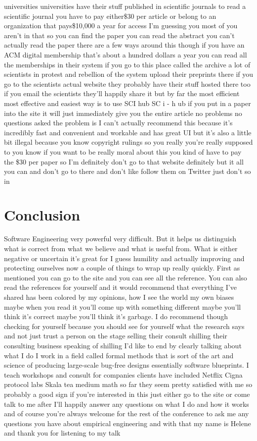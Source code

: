 \documentclass[conference, compsoc, twoside]{IEEEtran}
\begin{document}
universities universities have their
stuff published in scientific journals
to read a scientific journal you have to
pay either\$30 per article or belong to
an organization that pays\$10,000 a year
for access I'm guessing you most of you
aren't in that so you can find the paper
you can read the abstract you can't
actually read the paper there are a few
ways around this though if you have an
ACM digital membership that's about a
hundred dollars a year you can read all
the memberships in their system if you
go to this place called the archive a
lot of scientists in protest and
rebellion of the system upload their
preprints there if you go to the
scientists actual website they probably
have their stuff hosted there too if you
email the scientists they'll happily
share it but by far the most efficient
most effective and easiest way is to use
SCI hub SC i - h ub if you put in a
paper into the site it will just
immediately give you the entire article
no problems no questions asked the
problem is I can't actually recommend
this because it's incredibly fast and
convenient and workable and has great UI
but it's also a little bit illegal
because you know copyright rulings so
you really you're really supposed to you
know if you want to be really moral
about this you kind of have to pay the
\$30 per paper so I'm definitely don't go
to that website definitely but it all
you can and don't go to there and don't
like follow them on Twitter just don't
so in 

\section{Conclusion}
Software Engineering very powerful very difficult.
But it helps us distinguish what is correct from what we believe and what is useful from.
What is either negative or uncertain it's great for I guess humility and actually improving and protecting ourselves now a couple of things to wrap up really quickly.
First as mentioned you can go to the site and you can see all the reference.
You can also read the references for yourself and it would recommend that everything I've shared
has been colored by my opinions, how I see the world my own biases maybe when
you read it you'll come up with
something different maybe you'll think
it's correct maybe you'll think it's garbage.
I do recommend though checking for yourself because you should see for yourself what the research says and not
just trust a person on the stage selling their consult shilling their consulting business speaking of shilling I'd like
to end by clearly talking about what I
do I work in a field called formal
methods that is sort of the art and
science of producing large-scale
bug-free designs essentially software blueprints.
I teach workshops and consult for companies
clients have included Netflix Cigna
protocol labs Skala tea medium math so
far they seem pretty satisfied with me
so probably a good sign if you're
interested in this just either go to the
site or come talk to me after I'll
happily answer any questions on what I
do and how it works and of course you're
always welcome for the rest of the
conference to ask me any questions you
have about empirical engineering and
with that my name is Helene and thank
you for listening to my talk


\end{document}

